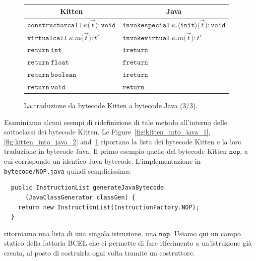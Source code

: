 \begin{figure}
\begin{center}
\begin{tabular}{l|l}
\multicolumn{1}{c}{Kitten} &
\multicolumn{1}{c}{Java} \\\hline\hline
$\mathtt{constructorcall\ \kappa(}$$\vec{t}$$\mathtt{):void}$ & $\mathtt{invokespecial\ \kappa.\langle init\rangle(}$$\vec{t}$$\mathtt{):void}$ \\\hline
$\mathtt{virtualcall\ \kappa.\mathit{m}(}$$\vec{t}$$\mathtt{):\mathit{t'}}$ & $\mathtt{invokevirtual\ \kappa.\mathit{m}(}$$\vec{t}$$\mathtt{):\mathit{t'}}$ \\\hline
$\mathtt{return\ int}$ & $\mathtt{ireturn}$ \\\hline
$\mathtt{return\ float}$ & $\mathtt{freturn}$ \\\hline
$\mathtt{return\ boolean}$ & $\mathtt{ireturn}$ \\\hline
$\mathtt{return\ void}$ & $\mathtt{return}$ \\\hline
\end{tabular}
\end{center}
\caption{La traduzione da bytecode Kitten a bytecode Java (3/3).}
  \label{fig:kitten_into_java_3}
\end{figure}

Esaminiamo alcuni esempi di ridefinizione di tale metodo all'interno delle
sottoclassi dei bytecode Kitten. Le Figure~\ref{fig:kitten_into_java_1},
\ref{fig:kitten_into_java_2} and~\ref{fig:kitten_into_java_3} riportano
la lista dei bytecode Kitten e la loro traduzione in bytecode Java. Il primo
esempio \e quello del bytecode Kitten $\mathtt{nop}$, a cui corrisponde un
identico Java bytecode. L'implementazione in \texttt{bytecode/NOP.java} \e quindi semplicissima:
%
\begin{verbatim}
  public InstructionList generateJavaBytecode
      (JavaClassGenerator classGen) {
    return new InstructionList(InstructionFactory.NOP);
  }
\end{verbatim}
%
ritorniamo \cioe una lista di una singola istruzione, una $\mathtt{nop}$. Usiamo qui un
campo statico
della fattoria BCEL che ci permette di fare riferimento a un'istruzione gi\`a creata, al posto
di costruirla ogni volta tramite un costruttore.

